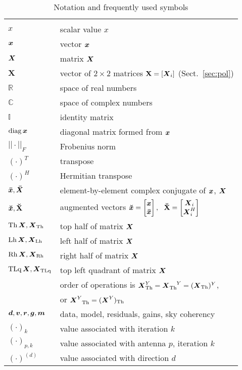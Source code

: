 \documentclass[useAMS,usenatbib]{mn2e}
\newcommand{\COMPLEX}{\mathbb{C}}
\newcommand{\REAL}{\mathbb{R}}
\newcommand{\II}{\mathbb{I}}
\begin{document}
\begin{table}
\caption{\label{tab:notation}Notation and frequently used symbols}
\begin{tabular}{ll}
\hline\\
$x$        & scalar value $x$    \\
$\bmath{x}$  & vector $\bmath{x}$  \\
$\bmath{X}$  & matrix $\bmath{X}$ \\
$\mathbf{X}$  & vector of $2\times2$ matrices $\mathbf{X}=[\bmath{X}_i]$ (Sect.~\ref{sec:pol})  \\
$\REAL$ & space of real numbers \\
$\COMPLEX$ & space of complex numbers \\
$\II$ & identity matrix \\
$\mathrm{diag}\,\bmath{x}$ & diagonal matrix formed from $\bmath{x}$\\
$||\cdot||_F$ & Frobenius norm \\
$(\cdot)^T$ & transpose \\
$(\cdot)^H$ & Hermitian transpose \\
$\bmath{\bar x},\bmath{\bar X}$ & element-by-element complex conjugate of $\bmath{x}$, $\bmath{X}$  \\
$\AUG{x}, \AUGx{X}$ & augmented vectors $\AUG{x} = \Matrix{c}{\bmath{x} \\ \bmath{\bar x}},~~\AUGx{X}=\Matrix{c}{\bmath{X}_i \\ \bmath{X}^H_i}$ \\
$\TOP\,\bmath{X}, \bmath{X}_\TOP$ & top half of matrix $\bmath{X}$\\
$\LEFT\,\bmath{X}, \bmath{X}_\LEFT$ & left half of matrix $\bmath{X}$ \\
$\RIGHT\,\bmath{X}, \bmath{X}_\RIGHT$ & right half of matrix $\bmath{X}$\\
$\UL\,\bmath{X}, \bmath{X}_\UL$ & top left quadrant of matrix $\bmath{X}$\\
& order of operations is $\bmath{X}^Y_\TOP = \bmath{X}^{~~~Y}_\TOP = (\bmath{X}_\TOP)^Y$, \\
& or $\bmath{X}^Y_{~~\TOP} = (\bmath{X}^Y)_\TOP$ \\
$\bmath{d},\bmath{v},\bmath{r}, \bmath{g}, \bmath{m} $ & data, model, residuals, gains, sky coherency\\
$(\cdot)_k$ & value associated with iteration $k$ \\
$(\cdot)_{p,k}$ & value associated with antenna $p$, iteration $k$ \\
$(\cdot)^{(d)}$ & value associated with direction $d$\\

\end{tabular}
\end{table}
\end{document}
